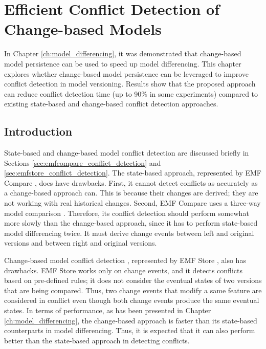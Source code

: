 \chapter{Efficient Conflict Detection of Change-based Models}
\label{ch:conflict_detection}

In Chapter \ref{ch:model_differencing}, it was demonstrated that change-based model persistence can be used to speed up model differencing. This chapter explores whether change-based model persistence can be leveraged to improve conflict detection in model versioning. Results show that the proposed approach can reduce conflict detection time (up to 90\% in some experiments) compared to existing state-based and change-based conflict detection approaches.

\section{Introduction}
\label{sec:introduction_7}
State-based and change-based model conflict detection are discussed briefly in Sections \ref{sec:emfcompare_conflict_detection} and \ref{sec:emfstore_conflict_detection}. The state-based approach, represented by EMF Compare \cite{emfcompare2018developer}, does have drawbacks. First, it cannot detect conflicts as accurately as a change-based approach can. This is because their changes are derived; they are not working with real historical changes. Second, EMF Compare uses a three-way model comparison \cite{emfcompare2018developer}. Therefore, its conflict detection should perform somewhat more slowly than the change-based approach, since it has to perform state-based model differencing twice. It must derive change events between left and original versions and between right and original versions.

Change-based model conflict detection \cite{koegel2010operation}, represented by EMF Store \cite{emfstore2019what}, also has drawbacks. EMF Store works only on change events,  and it detects conflicts based on pre-defined rules; it does not consider the eventual states of two versions that are being compared. Thus, two change events that modify a same feature are considered in conflict even though both change events produce the same eventual states. In terms of performance, as has been presented in Chapter \ref{ch:model_differencing}, the change-based approach is faster than its state-based counterparts in model differencing. Thus, it is expected that it can also perform better than the state-based approach in detecting conflicts.

